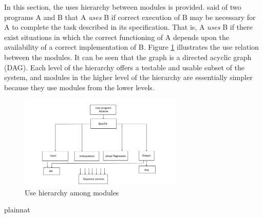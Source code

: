 \documentclass[12pt, titlepage]{article}
\begin{document}
In this section, the uses hierarchy between modules is
provided. \citet{Parnas1978} said of two programs A and B that A {\em uses} B if
correct execution of B may be necessary for A to complete the task described in
its specification. That is, A {\em uses} B if there exist situations in which
the correct functioning of A depends upon the availability of a correct
implementation of B.  Figure \ref{FigUH} illustrates the use relation between
the modules. It can be seen that the graph is a directed acyclic graph
(DAG). Each level of the hierarchy offers a testable and usable subset of the
system, and modules in the higher level of the hierarchy are essentially simpler
because they use modules from the lower levels.

\begin{figure}[H]
\centering
\includegraphics[width=0.7\textwidth]{UsesHierarchy.png}
\caption{Use hierarchy among modules}
\label{FigUH}
\end{figure}



 {plainnat}

\end{document}
